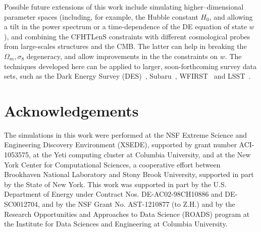\documentclass[reprint,aps,prd,superscriptaddress,showkeys,showpacs]{revtex4-1}
\begin{document}
Possible future extensions of this work include simulating
higher--dimensional parameter spaces (including, for example, the
Hubble constant $H_0$, and allowing a tilt in the power spectrum or a
time-dependence of the DE equation of state $w$), and combining the
CFHTLenS constraints with different cosmological probes from
large-scales structures and the CMB. The latter can help in breaking
the $\Omega_m,\sigma_8$ degeneracy, and allow improvements in the the
constraints on $w$.  The techniques developed here can be applied to
larger, soon-forthcoming survey data sets, such as the Dark Energy Survey (DES)~\citep{DES}, Subaru~\citep{Subaru}, WFIRST~\citep{WFIRST} and LSST~\citep{LSST}.  

 

\section*{Acknowledgements}

The simulations in this work were performed at the NSF Extreme Science
and Engineering Discovery Environment (XSEDE), supported by grant
number ACI-1053575, at the Yeti computing cluster at Columbia
University, and at the New York Center for Computational Sciences, a cooperative
effort between Brookhaven National Laboratory and Stony Brook
University, supported in part by the State of New York. This work was
supported in part by the U.S. Department of Energy under Contract
Nos. DE-AC02-98CH10886 and DE-SC0012704, and by the NSF Grant
No. AST-1210877 (to Z.H.) and by the Research Opportunities and
Approaches to Data Science (ROADS) program at the Institute for Data
Sciences and Engineering at Columbia University.


\label{lastpage}
\end{document}
